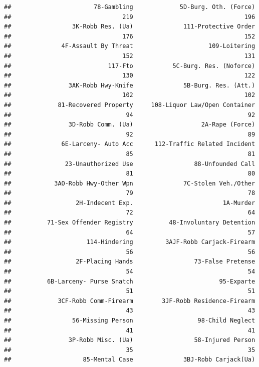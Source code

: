 \documentclass[]{book}
\theoremstyle{definition}
\theoremstyle{definition}
\theoremstyle{remark}
\begin{document}
\begin{verbatim}
##                       78-Gambling             5D-Burg. Oth. (Force) 
##                               219                               196 
##                 3K-Robb Res. (Ua)              111-Protective Order 
##                               176                               152 
##              4F-Assault By Threat                     109-Loitering 
##                               152                               131 
##                           117-Fto           5C-Burg. Res. (Noforce) 
##                               130                               122 
##                3AK-Robb Hwy-Knife              5B-Burg. Res. (Att.) 
##                               102                               102 
##             81-Recovered Property     108-Liquor Law/Open Container 
##                                94                                92 
##                3D-Robb Comm. (Ua)                   2A-Rape (Force) 
##                                92                                89 
##              6E-Larceny- Auto Acc      112-Traffic Related Incident 
##                                85                                81 
##               23-Unauthorized Use                 88-Unfounded Call 
##                                81                                80 
##            3AO-Robb Hwy-Other Wpn              7C-Stolen Veh./Other 
##                                79                                78 
##                  2H-Indecent Exp.                         1A-Murder 
##                                72                                64 
##          71-Sex Offender Registry          48-Involuntary Detention 
##                                64                                57 
##                     114-Hindering         3AJF-Robb Carjack-Firearm 
##                                56                                56 
##                  2F-Placing Hands                 73-False Pretense 
##                                54                                54 
##          6B-Larceny- Purse Snatch                        95-Exparte 
##                                51                                51 
##             3CF-Robb Comm-Firearm        3JF-Robb Residence-Firearm 
##                                43                                43 
##                 56-Missing Person                  98-Child Neglect 
##                                41                                41 
##                3P-Robb Misc. (Ua)                 58-Injured Person 
##                                35                                35 
##                    85-Mental Case              3BJ-Robb Carjack(Ua) 

\end{verbatim}
\end{document}
